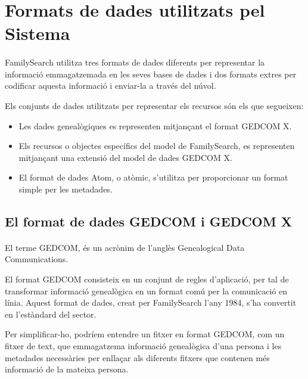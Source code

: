\section{Formats de dades utilitzats pel Sistema}

    \paragraph{}
    FamilySearch utilitza tres formats de dades diferents per representar la informació emmagatzemada en les seves bases de dades i dos formats extres per codificar aquesta informació i enviar-la a través del núvol.

    Els conjunts de dades utilitzats per representar els recursos són els que segueixen:

    \begin{itemize}
        \item Les dades genealògiques es representen mitjançant el format GEDCOM X.
        \item Els recursos o objectes específics del model de FamilySearch, es representen mitjançant una extensió del model de dades GEDCOM X.
        \item El format de dades Atom, o atòmic, s’utilitza per proporcionar un format simple per les metadades.
    \end{itemize}


    \subsection{El format de dades GEDCOM i GEDCOM X}

        \paragraph{}
        El terme \gls{GEDCOM}, és un acrònim de l'anglès Genealogical Data Communications.

        El format GEDCOM consisteix en un conjunt de regles d'aplicació, per tal de transformar informació genealògica en un format comú per la comunicació en línia. Aquest format de dades, creat per FamilySearch l'any 1984, s'ha convertit en l'estàndard del sector.

        Per simplificar-ho, podríem entendre un fitxer en format GEDCOM, com un fitxer de text, que emmagatzema informació genealògica d’una persona i les metadades necessàries per enllaçar als diferents fitxers que contenen més informació de la mateixa persona.

